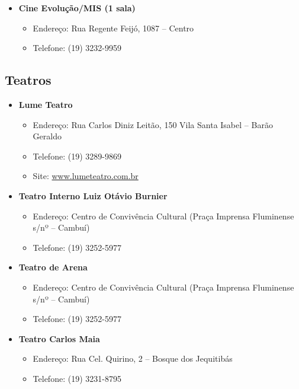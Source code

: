 \begin{itemize}
\item  \textbf{Cine Evolução/MIS (1 sala)}
\begin{itemize}
\item  Endereço: Rua Regente Feijó, 1087 -- Centro
\item  Telefone: (19) 3232-9959
\end{itemize}
\end{itemize}

\subsection{Teatros}

\begin{itemize}
\item  \textbf{Lume Teatro}
\begin{itemize}
\item  Endereço:  Rua Carlos Diniz Leitão, 150 Vila Santa Isabel -- Barão Geraldo
\item  Telefone: (19) 3289-9869
\item  Site: \url{www.lumeteatro.com.br}
\end{itemize}
\end{itemize}

\begin{itemize}
\item  \textbf{Teatro Interno Luiz Otávio Burnier}
\begin{itemize}
\item  Endereço: Centro de Convivência Cultural (Praça Imprensa Fluminense s/nº -- Cambuí)
\item  Telefone: (19) 3252-5977
\end{itemize}
\end{itemize}

\begin{itemize}
\item  \textbf{Teatro de Arena}
\begin{itemize}
\item  Endereço: Centro de Convivência Cultural (Praça Imprensa Fluminense s/nº -- Cambuí)
\item  Telefone: (19) 3252-5977
\end{itemize}
\end{itemize}

\begin{itemize}
\item  \textbf{Teatro Carlos Maia}
\begin{itemize}
\item  Endereço: Rua Cel. Quirino, 2 -- Bosque dos Jequitibás
\item  Telefone: (19) 3231-8795
\end{itemize}
\end{itemize}

